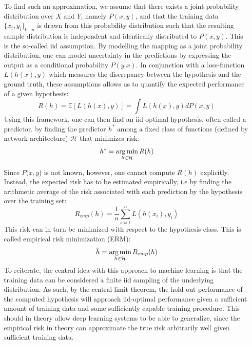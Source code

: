 		To find such an approximation, we assume that there exists a joint probability distribution over \(X\) and \(Y\), namely \(P(x,y)\), and that the training data \(\{x_i, y_i\}_{0...n}\) is drawn from this probability distribution such that the resulting sample distribution is independent and identically distributed to \(P(x,y)\). This is the so-called iid assumption. By modelling the mapping as a joint probability distribution, one can model uncertainty in the predictions by expressing the output as a conditional probability \(P(y|x)\). In conjunction with a loss-function \(L(h(x),y)\) which measures the discrepancy between the hypothesis and the ground truth, these assumptions allows us to quantify the expected performance of a given hypothesis:
		\begin{equation}
		    R(h) = \mathbb{E}[L(h(x),y)] = \int L(h(x),y) dP(x,y)
		\end{equation}
		Using this framework, one can then find an iid-optimal hypothesis, often called a predictor, by finding the predictor \(h^*\) among a fixed class of functions (defined by network architecture) \(\mathcal{H}\) that minimizes risk:
		\begin{equation}
		h^* = \operatorname*{arg\,min}_{h \in \mathcal{H}}R(h)
		\end{equation}
		
		Since \(P(x,y\)) is not known, however, one cannot compute \(R(h)\) explicitly. Instead, the expected risk has to be estimated empirically, i.e by finding the arithmetic average of the risk associated with each prediction by the hypothesis over the training set:
		\begin{equation}
		R_{emp}(h) = \frac{1}{n}\sum_{i=1}^{n}L(h(x_i), y_i)
		\end{equation}
		This risk can in turn be minimized with respect to the hypothesis class. This is called empirical risk minimization (ERM):
		\begin{equation}
		\hat{h} = \operatorname*{arg\,min}_{h \in \mathcal{H}}R_{emp}(h)
		\end{equation}
		To reiterate, the central idea with this approach to machine learning is that the training data can be considered a finite iid sampling of the underlying distribution. As such, by the central limit theorem, the hold-out performance of the computed hypothesis will approach iid-optimal performance given a sufficient amount of training data and some sufficiently capable training procedure. This should in theory allow deep learning systems to be able to generalize, since the empirical risk in theory can approximate the true risk arbitrarily well given sufficient training data.

